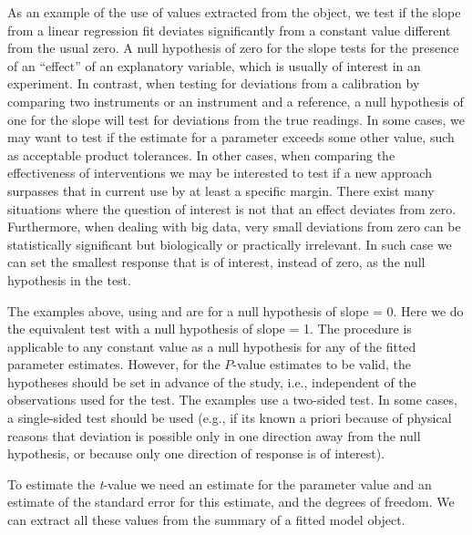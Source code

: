 \documentclass[krantz2]{krantz}\usepackage{knitr}
\begin{document}
\begin{advplayground}
As an example of the use of values extracted from the  object, we test if the slope from a linear regression fit deviates significantly from a constant value different from the usual zero. A null hypothesis of zero for the slope tests for the presence of an ``effect'' of an explanatory variable, which is usually of interest in an experiment. In contrast, when testing for deviations from a calibration by comparing two instruments or an instrument and a reference, a null hypothesis of one for the slope will test for deviations from the true readings. In some cases, we may want to test if the estimate for a parameter exceeds some other value, such as acceptable product tolerances. In other cases, when comparing the effectiveness of interventions we may be interested to test if a new approach surpasses that in current use by at least a specific margin. There exist many situations where the question of interest is not that an effect deviates from zero. Furthermore, when dealing with big data, very small deviations from zero can be statistically significant but biologically or practically irrelevant. In such case we can set the smallest response that is of interest, instead of zero, as the null hypothesis in the test.

The examples above, using  and  are for a null hypothesis of slope = 0. Here we do the equivalent test with a null hypothesis of slope = 1. The procedure is applicable to any constant value as a null hypothesis for any of the fitted parameter estimates. However, for the $P$-value estimates to be valid, the hypotheses should be set in advance of the study, i.e., independent of the observations used for the test. The examples use a two-sided test. In some cases, a single-sided test should be used (e.g., if its known a priori because of physical reasons that deviation is possible only in one direction away from the null hypothesis, or because only one direction of response is of interest).

To estimate the \emph{t}-value we need an estimate for the parameter value and an estimate of the standard error for this estimate, and the degrees of freedom. We can extract all these values from the summary of a fitted model object.

\begin{knitrout}\footnotesize
{}\color{fgcolor}\begin{kframe}
\begin{alltt}
 \hlkwb{<-} \hlopt{$}\hlstd{coefficients[}\hlstd{,} \hlstd{]}
 \hlkwb{<-} \hlopt{$}\hlstd{coefficients[}\hlstd{,} \hlstd{]}
 \hlkwb{<-} \hlopt{$}\hlstd{df[}\hlstd{]}
\end{alltt}
\end{kframe}
\end{knitrout}


\end{advplayground}
\end{document}
